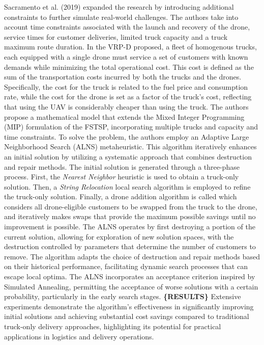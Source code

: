 \documentclass{article}
\begin{document}
	Sacramento et al. (2019) expanded the research by introducing additional constraints to further simulate real-world challenges. The authors take into account time constraints associated with the launch and recovery of the drone, service times for customer deliveries, limited truck capacity and a truck maximum route duration. In the VRP-D proposed, a fleet of homogenous trucks, each equipped with a single drone must service a set of customers with known demands while minimizing the total operational cost. This cost is defined as the sum of the transportation costs incurred by both the trucks and the drones. Specifically, the cost for the truck is related to the fuel price and consumption rate, while the cost for the drone is set as a factor of the truck's cost, reflecting that using the UAV is considerably cheaper than using the truck. The authors propose a mathematical model that extends the Mixed Integer Programming (MIP) formulation of the FSTSP, incorporating multiple trucks and capacity and time constraints. To solve the problem, the authors employ an Adaptive Large Neighborhood Search (ALNS) metaheuristic. This algorithm iteratively enhances an initial solution by utilizing a systematic approach that combines destruction and repair methods. The initial solution is generated through a three-phase process. First, the \textit{Nearest Neighbor} heuristic is used to obtain a truck-only solution. Then, a \textit{String Relocation} local search algorithm is employed to refine the truck-only solution. Finally, a drone addition algorithm is called which considers all drone-eligible customers to be swapped from the truck to the drone, and iteratively makes swaps that provide the maximum possible savings until no improvement is possible. The ALNS operates by first destroying a portion of the current solution, allowing for exploration of new solution spaces, with the destruction controlled by parameters that determine the number of customers to remove. The algorithm adapts the choice of destruction and repair methods based on their historical performance, facilitating dynamic search processes that can escape local optima. The ALNS incorporates an acceptance criterion inspired by Simulated Annealing, permitting the acceptance of worse solutions with a certain probability, particularly in the early search stages. \textbf{\{RESULTS\}} Extensive experiments demonstrate the algorithm's effectiveness in significantly improving initial solutions and achieving substantial cost savings compared to traditional truck-only delivery approaches, highlighting its potential for practical applications in logistics and delivery operations.
\end{document}
